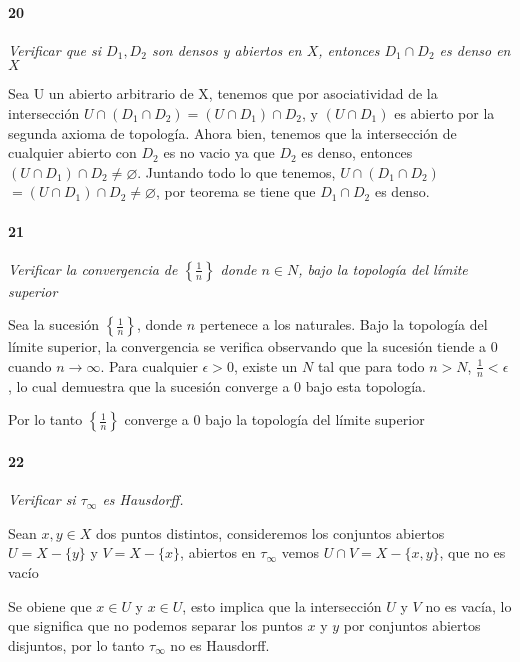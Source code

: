 \documentclass[12pt]{article}
\begin{document}
\paragraph{20}
\textit{Verificar que si $D_{1}, D_{2}$ son densos y abiertos en $X$, entonces $D_{1} \cap D_{2}$ es denso en $X$}

Sea U un abierto arbitrario de X, tenemos que por
asociatividad de la intersecci\'on
$U \cap (D_{1} \cap D_{2}) = (U \cap D_{1}) \cap D_{2}$,
y $(U \cap D_{1})$ es abierto por la segunda axioma de
topolog\'ia. Ahora bien, tenemos que la intersecci\'on de
cualquier abierto con $D_{2}$ es no vacio ya que $D_{2}$ es
denso, entonces $(U \cap D_{1}) \cap D_{2} \neq \varnothing$.
Juntando todo lo que tenemos, $U \cap (D_{1} \cap D_{2})$
$= (U \cap D_{1}) \cap D_{2} \neq \varnothing$, por teorema
se tiene que $D_{1} \cap D_{2}$ es denso.

\paragraph{21}
\textit{Verificar la convergencia de $\left\{\frac{1}{n}\right\}$ donde $n \in N $, bajo la topolog\'ia del l\'imite superior }

Sea la sucesi\'on \(\left\{\frac{1}{n}\right\}\), donde \(n\) pertenece a los naturales. Bajo la topolog\'ia del l\'imite superior, la convergencia se verifica observando que la sucesi\'on tiende a 0 cuando \(n \to \infty\). Para cualquier \(\epsilon > 0\), existe un \(N\) tal que para todo \(n > N\), \(\frac{1}{n} < \epsilon\), lo cual demuestra que la sucesión converge a 0 bajo esta topolog\'ia. 

Por lo tanto \(\left\{\frac{1}{n}\right\}\) converge a 0 bajo la topolog\'ia del l\'imite superior

\paragraph{22}
\textit{Verificar si \(\tau_{\infty}\) es Hausdorff.}

Sean \(x, y \in X\) dos puntos distintos, consideremos los conjuntos abiertos \(U = X - \{y\}\) y \(V = X - \{x\}\), abiertos en \(\tau_{\infty}\)
vemos \(U \cap V = X - \{x, y\}\), que no es vac\'io

Se obiene que \(x \in U\) y \(x \in U\), esto implica que la intersecci\'on \(U\) y \(V\) no es vacía, lo que significa que no podemos separar los puntos
\(x\) y \(y\) por conjuntos abiertos disjuntos, por lo tanto \(\tau_{\infty}\) no es Hausdorff.
\end{document}
